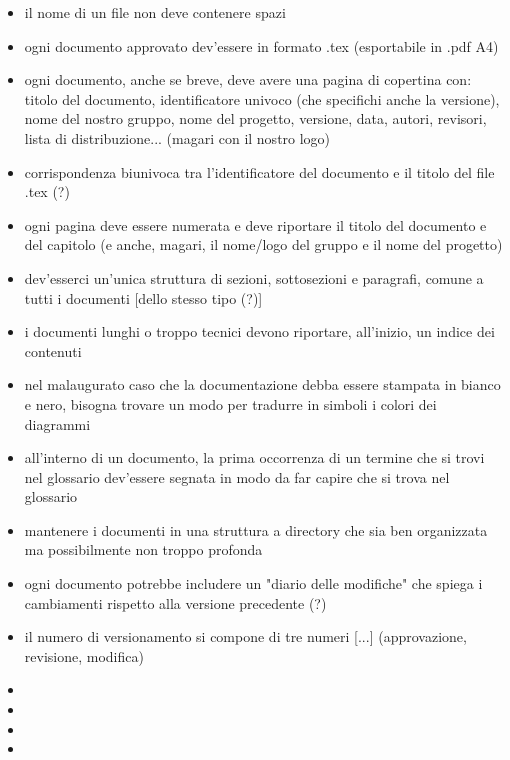 \begin{itemize}
	\item il nome di un file non deve contenere spazi 
	\item ogni documento approvato dev'essere in formato .tex (esportabile in .pdf A4)
	\item ogni documento, anche se breve, deve avere una pagina di copertina con: titolo del documento, identificatore univoco (che specifichi anche la versione), nome del nostro gruppo, nome del progetto, versione, data, autori, revisori, lista di distribuzione... (magari con il nostro logo)
	\item corrispondenza biunivoca tra l'identificatore del documento e il titolo del file .tex (?)
	\item ogni pagina deve essere numerata e deve riportare il titolo del documento e del capitolo (e anche, magari, il nome/logo del gruppo e il nome del progetto)
	\item dev'esserci un'unica struttura di sezioni, sottosezioni e paragrafi, comune a tutti i documenti [dello stesso tipo (?)]
	\item i documenti lunghi o troppo tecnici devono riportare, all'inizio, un indice dei contenuti
	\item nel malaugurato caso che la documentazione debba essere stampata in bianco e nero, bisogna trovare un modo per tradurre in simboli i colori dei diagrammi
	\item all'interno di un documento, la prima occorrenza di un termine che si trovi nel glossario dev'essere segnata in modo da far capire che si trova nel glossario
	\item mantenere i documenti in una struttura a directory che sia ben organizzata ma possibilmente non troppo profonda
	\item ogni documento potrebbe includere un "diario delle modifiche" che spiega i cambiamenti rispetto alla versione precedente (?)
	\item il numero di versionamento si compone di tre numeri [...] (approvazione, revisione, modifica)
	\item 
	\item 
	\item 
	\item 
\end{itemize}


